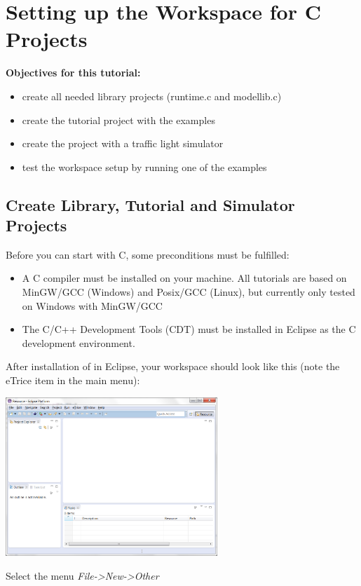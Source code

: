\section{Setting up the Workspace for C Projects}

\textbf{Objectives for this tutorial:}
\begin{itemize}
	\item create all needed library projects (runtime.c and modellib.c)
	\item create the tutorial project with the examples
	\item create the project with a traffic light simulator
	\item test the workspace setup by running one of the examples
\end{itemize}

\subsection{Create Library, Tutorial and Simulator Projects}

Before you can start with C, some preconditions must be fulfilled:

\begin{itemize}
\item A C compiler must be installed on your machine. All tutorials are based on MinGW/GCC (Windows) and Posix/GCC (Linux), but currently only tested on Windows with MinGW/GCC
\item The C/C++ Development Tools (CDT) must be installed in Eclipse as the C development environment.
\end{itemize}

After installation of \eTrice{} in Eclipse, your workspace should look like this (note the eTrice item in the main menu):  

\includegraphics[width=0.6\textwidth]{images/013-SetupWorkspace01.png}

Select the menu \emph{File->New->Other}

